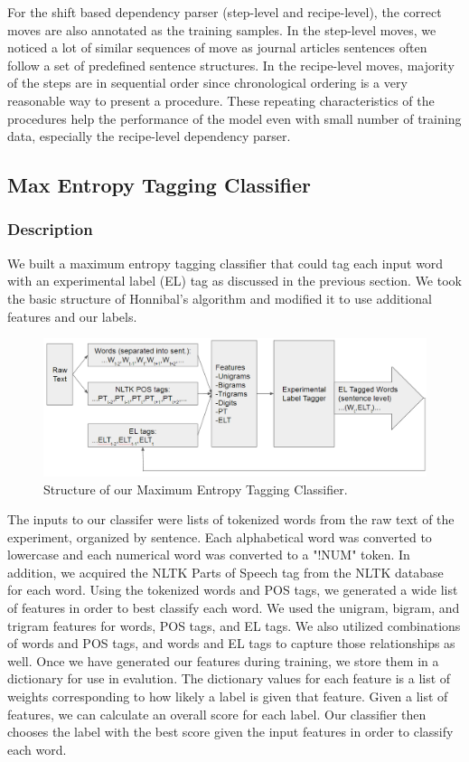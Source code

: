 For the shift based dependency parser (step-level and recipe-level), the correct moves are also annotated as the training samples. In the step-level moves, we noticed a lot of similar sequences of move as journal articles sentences often follow a set of predefined sentence structures. In the recipe-level moves, majority of the steps are in sequential order since chronological ordering is a very reasonable way to present a procedure. These repeating characteristics of the procedures help the performance of the model even with small number of training data, especially the recipe-level dependency parser. 

\subsection{Max Entropy Tagging Classifier}

\subsubsection{Description}
We built a maximum entropy tagging classifier that could tag each input word with an experimental label (EL) tag as discussed in the previous section. We took the basic structure of Honnibal's algorithm \cite{honnibal} and modified it to use additional features and our labels.

\begin{figure}
  \centering
    \includegraphics[width=.5\textwidth]{tagger.png}
  \caption{Structure of our Maximum Entropy Tagging Classifier.}
\end{figure}

The inputs to our classifer were lists of tokenized words from the raw text of the experiment, organized by sentence. Each alphabetical word was converted to lowercase and each numerical word was converted to a "!NUM" token. In addition, we acquired the NLTK \cite{nltk} Parts of Speech tag from the NLTK database for each word. Using the tokenized words and POS tags, we generated a wide list of features in order to best classify each word. We used the unigram, bigram, and trigram features for words, POS tags, and EL tags. We also utilized combinations of words and POS tags, and words and EL tags to capture those relationships as well. Once we have generated our features during training, we store them in a dictionary for use in evalution. The dictionary values for each feature is a list of weights corresponding to how likely a label is given that feature. Given a list of features, we can calculate an overall score for each label. Our classifier then chooses the label with the best score given the input features in order to classify each word. 

